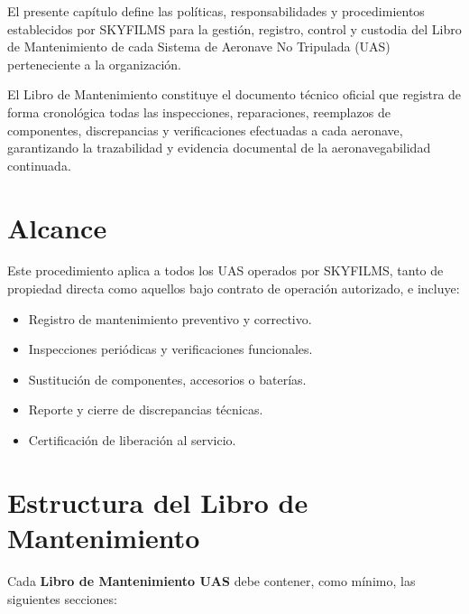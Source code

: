 El presente capítulo define las políticas, responsabilidades y procedimientos establecidos por SKYFILMS para la gestión, registro, control y custodia del Libro de Mantenimiento de cada Sistema de Aeronave No Tripulada (UAS) perteneciente a la organización.

El Libro de Mantenimiento constituye el documento técnico oficial que registra de forma cronológica todas las inspecciones, reparaciones, reemplazos de componentes, discrepancias y verificaciones efectuadas a cada aeronave, garantizando la trazabilidad y evidencia documental de la aeronavegabilidad continuada.

\section{Alcance}
Este procedimiento aplica a todos los UAS operados por SKYFILMS, tanto de propiedad directa como aquellos bajo contrato de operación autorizado, e incluye:

\begin{itemize}
    \item Registro de mantenimiento preventivo y correctivo.

    \item Inspecciones periódicas y verificaciones funcionales.

    \item Sustitución de componentes, accesorios o baterías.

    \item Reporte y cierre de discrepancias técnicas.

    \item Certificación de liberación al servicio.
\end{itemize}

\section{Estructura del Libro de Mantenimiento}
Cada \textbf{Libro de Mantenimiento UAS} debe contener, como mínimo, las siguientes secciones:

